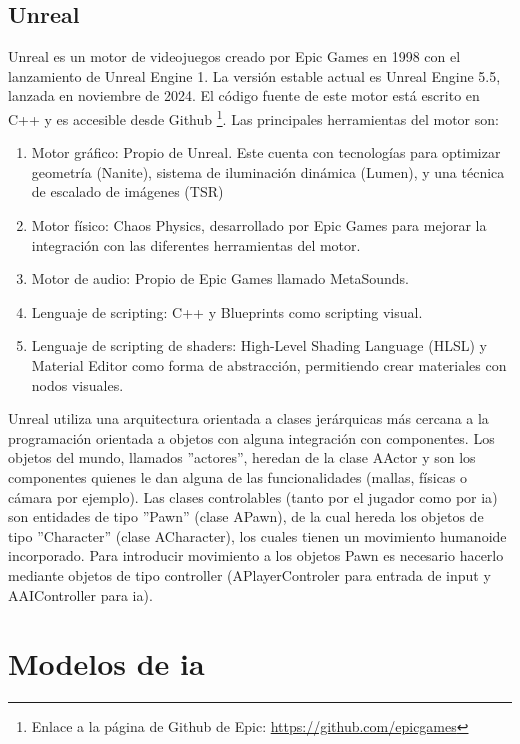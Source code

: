 \subsection{Unreal}
Unreal es un motor de videojuegos creado por Epic Games en 1998 con el lanzamiento de Unreal Engine 1.
La versión estable actual es Unreal Engine 5.5, lanzada en noviembre de 2024.
El código fuente de este motor está escrito en C++ y es accesible desde Github \footnote{Enlace a la página de Github de Epic: \url{https://github.com/epicgames}}.
Las principales herramientas del motor son:


\begin{enumerate}
    \item Motor gráfico: Propio de Unreal. Este cuenta con  tecnologías para optimizar geometría (Nanite), sistema de iluminación dinámica (Lumen), y una técnica de escalado de imágenes (TSR)
    \item Motor físico: Chaos Physics, desarrollado por Epic Games para mejorar la integración con las diferentes herramientas del motor.
    \item Motor de audio: Propio de Epic Games llamado MetaSounds.
    \item Lenguaje de scripting: C++ y Blueprints como scripting visual.
    \item Lenguaje de scripting de shaders: High-Level Shading Language (HLSL) y Material Editor como forma de abstracción, permitiendo crear materiales con nodos visuales.
\end{enumerate}

Unreal utiliza una arquitectura orientada a clases jerárquicas más cercana a la programación orientada a objetos con alguna integración con componentes.
Los objetos del mundo, llamados ''actores'', heredan de la clase AActor y son los componentes quienes le dan alguna de las funcionalidades (mallas, físicas o cámara por ejemplo).
Las clases controlables (tanto por el jugador como por \gls{ia}) son entidades de tipo ''Pawn'' (clase APawn), de la cual hereda los objetos de tipo ''Character'' (clase ACharacter), los cuales tienen un movimiento humanoide incorporado.
Para introducir movimiento a los objetos Pawn es necesario hacerlo mediante objetos de tipo controller (APlayerControler para entrada de input y AAIController para \gls{ia}).

\section{Modelos de \gls{ia}}

